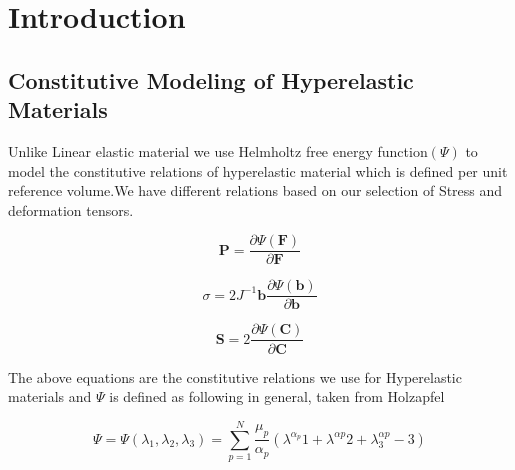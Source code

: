 \documentclass[12pt]{report}
\begin{document}
\section{Introduction}

\subsection{Constitutive Modeling of Hyperelastic Materials}
Unlike Linear elastic material we use Helmholtz free energy function$(\Psi)$ to model the constitutive relations of hyperelastic material which is defined per unit reference volume.We have different relations based on our selection of Stress and deformation tensors.

\begin{equation}\label{eq1.1}
    \textbf{P} = \frac{\partial \Psi(\textbf{F})}{\partial \textbf{F}}
\end{equation}

\begin{equation}\label{eq1.2}
    \sigma = 2J^{-1}\textbf{b}\frac{\partial \Psi(\textbf{b})}{\partial \textbf{b}}
\end{equation}

\begin{equation}\label{eq1.3}
    \textbf{S} = 2\frac{\partial \Psi(\textbf{C})}{\partial \textbf{C}}
\end{equation}

The above equations are the constitutive relations we use for Hyperelastic materials and $\Psi$ is defined as following in general, taken from Holzapfel\cite{holzapfel}

\begin{equation}\label{eq1.4}
    \Psi = \Psi(\lambda_{1},\lambda_{2},\lambda_{3}) = \sum_{p=1}^{N} \frac{\mu_{p}}{\alpha_{p}}(\lambda^{\alpha_{p}}{1} + \lambda^{\alpha{p}}{2} + \lambda^{\alpha{p}}_{3} -3)
\end{equation}

\vspace{-8mm}


\vspace{-8mm}

\newpage
\end{document}
